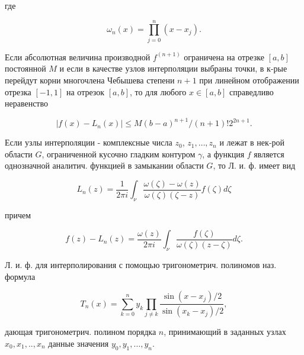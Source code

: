 \documentclass[10pt]{article}
\begin{document}
где



\[

\omega_{n}(x)=\prod_{j=0}^{n}\left(x-x_{j}\right) .

\]



Если абсолютная величина производной $f^{(n+1)}$ ограничена на отрезке $[a, b]$ постоянной $M$ и если в качестве узлов интерполяции выбраны точки, в к-рые перейдут корни многочлена Чебышева степени $n+1$ при линейном отображении отрезка $[-1,1]$ на отрезок $[a, b]$, то для любого $x \in[a, b]$ справедливо неравенство



\[

\left|f(x)-L_{n}(x)\right| \leqslant M(b-a)^{n+1} /(n+1) ! 2^{2 n+1} .

\]



Если узлы интерполяции - комплексные числа $z_{0}$, $z_{1}, \ldots, z_{n}$ и лежат в нек-рой области $G$, ограниченной кусочно гладким контуром $\gamma$, а функция $f$ является однозначной аналитич. функцией в замыкании области $G$, то Л. и. ф. имеет вид



\[

L_{n}(z)=\frac{1}{2 \pi i} \int_{\nu} \frac{\omega(\zeta)-\omega(z)}{\omega(\zeta)(\zeta-z)} f(\zeta) d \zeta

\]



причем



\[

f(z)-L_{n}(z)=\frac{\omega(z)}{2 \pi i} \int_{\nu} \frac{f(\zeta)}{\omega(\zeta)(z-\zeta)} d \zeta .

\]



Л. и. ф. для интерполирования с помощью тригонометрич. полиномов наз. формула



\[

T_{n}(x)=\sum_{k=0}^{n} y_{k} \prod_{j \neq k} \frac{\sin \left(x-x_{j}\right) / 2}{\sin \left(x_{k}-x_{j}\right) / 2},

\]



дающая тригонометрич. полином порядка $n$, принимающий в заданных узлах $x_{0}, x_{1}, . ., x_{n}$ данные значения $y_{0}, y_{1}, \ldots, y_{n}$.
\end{document}
